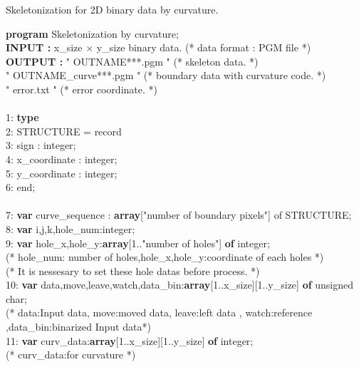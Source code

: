 \documentclass[a4paper,10pt]{jarticle}
\begin{document}
\begin{center}
{\Large Skeletonization for 2D binary data by curvature.}\\
\end{center}
{\bfseries program} Skeletonization by curvature;\\
{\bfseries INPUT : }x\_size $\times $ y\_size binary data. (* data format : PGM file *)\\
{\bfseries OUTPUT : }" OUTNAME***.pgm " (* skeleton data. *)\\
\hspace{2cm} " OUTNAME\_curve***.pgm " (* boundary data with curvature code. *)\\
\hspace{2cm} " error.txt " (* error coordinate. *)\\
\\
1: {\bfseries type}\\
2: \hspace{0.5cm}STRUCTURE = record\\
3: \hspace{1cm}sign : integer;\\
4: \hspace{1cm}x\_coordinate : integer;\\
5: \hspace{1cm}y\_coordinate : integer;\\
6: \hspace{0.5cm}end;\\
\\
7: {\bfseries var} curve\_sequence : {\bfseries array}["number of boundary pixels"] of STRUCTURE;\\
8: {\bfseries var} i,j,k,hole\_num:integer;\\
9: {\bfseries var} hole\_x,hole\_y:{\bfseries array}[1.."number of holes"] {\bfseries of} integer;\\
(* hole\_num: number of holes,hole\_x,hole\_y:coordinate of each holes *)\\
(* It is nessesary to set these hole datas before process. *)\\
10: {\bfseries var} data,move,leave,watch,data\_bin:{\bfseries array}[1..x\_size][1..y\_size] {\bfseries of} unsigned char;\\
(* data:Input data, move:moved data, leave:left data , watch:reference ,data\_bin:binarized Input data*)\\
11: {\bfseries var} curv\_data:{\bfseries array}[1..x\_size][1..y\_size] {\bfseries of} integer;\\
(* curv\_data:for curvature *)\\
\end{document}
